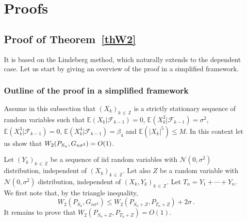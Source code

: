 \documentclass[AHL,Unicode,longabstracts,published]{cedram}
\newcommand{\bbE}{\mathbb{E}}
\newcommand{\bbZ}{\mathbb{Z}}
\newcommand{\clF}{\mathcal{F}}
\newcommand{\clN}{\mathcal{N}}
\begin{document}
\section{Proofs} \label{section4}


\subsection{Proof of Theorem~\ref{thW2}} \label{subproofTh}
It is based on the Lindeberg method, which naturally extends to the dependent case. Let us start by giving an overview of the proof in a simplified framework.

\subsubsection{Outline of the proof in a simplified framework}


Assume in this subsection that $(X_k)_{k\,\in\,\bbZ}$ is a strictly stationary sequence of random variables such that $\bbE (X_k | \clF_{k-1}) =0$, $\bbE (X^2_k | \clF_{k-1}) =\sigma^2$, $\bbE (X^3_k | \clF_{k-1}) =0$, $\bbE(X^4_k | \clF_{k-1}) =\beta_4$ and $\bbE (|X_k|^5) \leq M$. In this context let us show that $W_2 (P_{S_n}, G_{n \sigma^2})\linebreak = O (1)$.

Let $(Y_k)_{k\,\in\,\bbZ}$ be a sequence of iid random variables with $\clN (0, \sigma^2)$ distribution, independent of $(X_k)_{k\,\in\,\bbZ}$. Let also $Z$ be a random variable with $\clN (0,\sigma^2)$ distribution, independent of $(X_k,Y_k)_{k\,\in\,\bbZ}$. Let $T_n=Y_1 + \cdots +Y_n$. We first note that, by the triangle inequality,
\[
W_2  \left(P_{S_n}, G_{n \sigma^2}\right)\leq W_2 \left(P_{S_n+Z}, P_{T_n+Z}\right) + 2 \sigma \,.
\]
It remains to prove that $W_2 (P_{S_n+Z}, P_{T_n+Z})= O (1)$.
\end{document}
